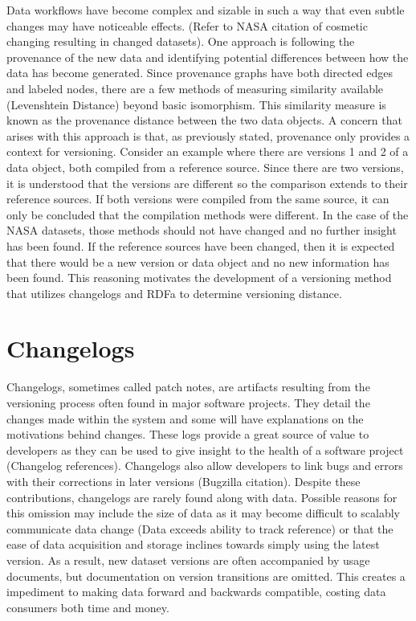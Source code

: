 Data workflows have become complex and sizable in such a way that even subtle changes may have noticeable effects.
(Refer to NASA citation of cosmetic changing resulting in changed datasets).
One approach is following the provenance of the new data and identifying potential differences between how the data has become generated.
Since provenance graphs have both directed edges and labeled nodes, there are a few methods of measuring similarity available (Levenshtein Distance) beyond basic isomorphism.
This similarity measure is known as the provenance distance between the two data objects.
A concern that arises with this approach is that, as previously stated, provenance only provides a context for versioning.
Consider an example where there are versions 1 and 2 of a data object, both compiled from a reference source.
Since there are two versions, it is understood that the versions are different so the comparison extends to their reference sources.
If both versions were compiled from the same source, it can only be concluded that the compilation methods were different.
In the case of the NASA datasets, those methods should not have changed and no further insight has been found.
If the reference sources have been changed, then it is expected that there would be a new version or data object and no new information has been found.
This reasoning motivates the development of a versioning method that utilizes changelogs and RDFa to determine versioning distance.

\section{Changelogs}

Changelogs, sometimes called patch notes, are artifacts resulting from the versioning process often found in major software projects.
They detail the changes made within the system and some will have explanations on the motivations behind changes.
These logs provide a great source of value to developers as they can be used to give insight to the health of a software project (Changelog references).
Changelogs also allow developers to link bugs and errors with their corrections in later versions (Bugzilla citation).
Despite these contributions, changelogs are rarely found along with data.
Possible reasons for this omission may include the size of data  as it may become difficult to scalably communicate data change (Data exceeds ability to track reference) or that the ease of data acquisition and storage inclines towards simply using the latest version.
As a result, new dataset versions are often accompanied by usage documents, but documentation on version transitions are omitted.
This creates a impediment to making data forward and backwards compatible, costing data consumers both time and money.

